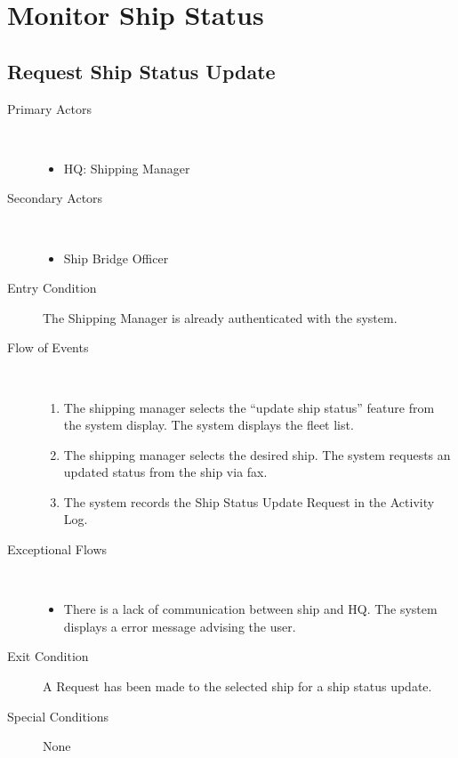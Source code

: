 \documentclass[a4paper,10pt]{report}
\begin{document}
\chapter{Monitor Ship Status}
\section{Request Ship Status Update}
\begin{description}
\item[Primary Actors] \
  \begin{itemize}
    \item HQ: Shipping Manager
  \end{itemize}
\item[Secondary Actors] \
  \begin{itemize}
    \item Ship Bridge Officer
  \end{itemize}
\item[Entry Condition]
  The Shipping Manager is already authenticated with the system.
\item[Flow of Events] \
  \begin{enumerate}
    \item The shipping manager selects the ``update ship status'' feature from the system display. The system displays the fleet list.
    \item The shipping manager selects the desired ship. The system requests an updated status from the ship via fax.
    \item The system records the Ship Status Update Request in the Activity Log.
  \end{enumerate}
\item[Exceptional Flows] \
  \begin{itemize}
   \item There is a lack of communication between ship and HQ. The system displays a error message advising the user.
  \end{itemize}
\item[Exit Condition]
  A Request has been made to the selected ship for a ship status update.

\item[Special Conditions] None
\end{description}
\end{document}
